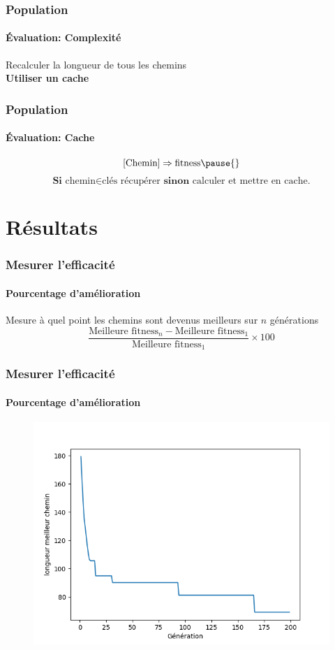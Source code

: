 \documentclass[16pt]{beamer}
\begin{document}
\begin{frame}
  \frametitle{Population}
  \framesubtitle{Évaluation: Complexité}
  Recalculer la longueur de tous les chemins \\ \pause{}
  \textbf{Utiliser un cache}
\end{frame}

\begin{frame}[fragile]
  \frametitle{Population}
  \framesubtitle{Évaluation: Cache}
  \[
    [\text{Chemin}] \Rightarrow \text{fitness} \pause{}
  \]
  \[
   \textbf{Si } \text{chemin} \in \text{clés} \text{ récupérer } \textbf{sinon} \text{ calculer et mettre en cache.}
  \]
\end{frame}

\section{Résultats}
\begin{frame}
  \frametitle{Mesurer l'efficacité}
  \framesubtitle{Pourcentage d'amélioration}
  \centering
  Mesure à quel point les chemins sont devenus meilleurs sur $n$ générations \pause{}
  \[
    \frac{\text{Meilleure fitness}_n - \text{Meilleure fitness}_1}{\text{Meilleure fitness}_1} \times 100
  \]
\end{frame}

\begin{frame}
  \frametitle{Mesurer l'efficacité}
  \framesubtitle{Pourcentage d'amélioration}
  \begin{figure}
    \includegraphics[scale=0.5]{evol.png}
  \end{figure}
\end{frame}
\end{document}
